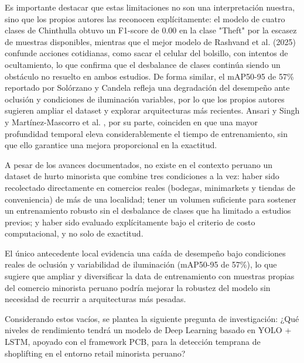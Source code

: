 Es importante destacar que estas limitaciones no son una interpretación nuestra, sino que los propios autores las reconocen explícitamente: el modelo de cuatro clases de Chinthulla \cite{chinthulla_deep_2025} obtuvo un F1-score de 0.00 en la clase "Theft" por la escasez de muestras disponibles, mientras que el mejor modelo de Rashvand et al. (2025) confunde acciones cotidianas, como sacar el celular del bolsillo, con intentos de ocultamiento, lo que confirma que el desbalance de clases continúa siendo un obstáculo no resuelto en ambos estudios. De forma similar, el mAP50-95 de 57\% reportado por Solórzano y Candela \cite{aguero_intelligent_2025} refleja una degradación del desempeño ante oclusión y condiciones de iluminación variables, por lo que los propios autores sugieren ampliar el dataset y explorar arquitecturas más recientes. Ansari y Singh \cite{ansari_optimized_2023} y Martínez-Mascorro et al. \cite{martinez-mascorro_suspicious_2021}, por su parte, coinciden en que una mayor profundidad temporal eleva considerablemente el tiempo de entrenamiento, sin que ello garantice una mejora proporcional en la exactitud.

A pesar de los avances documentados, no existe en el contexto peruano un dataset de hurto minorista que combine tres condiciones a la vez: haber sido recolectado directamente en comercios reales (bodegas, minimarkets y tiendas de conveniencia) de más de una localidad; tener un volumen suficiente para sostener un entrenamiento robusto sin el desbalance de clases que ha limitado a estudios previos; y haber sido evaluado explícitamente bajo el criterio de costo computacional, y no solo de exactitud.

El único antecedente local \cite{aguero_intelligent_2025} evidencia una caída de desempeño bajo condiciones reales de oclusión y variabilidad de iluminación (mAP50-95 de 57\%), lo que sugiere que ampliar y diversificar la data de entrenamiento con muestras propias del comercio minorista peruano podría mejorar la robustez del modelo sin necesidad de recurrir a arquitecturas más pesadas.


  Considerando estos vacíos, se plantea la siguiente pregunta de investigación: 
  ¿Qué niveles de rendimiento tendrá un modelo de Deep Learning basado en YOLO +
  LSTM, apoyado con el framework PCB, para la detección temprana de shoplifting en
  el entorno retail minorista peruano?
